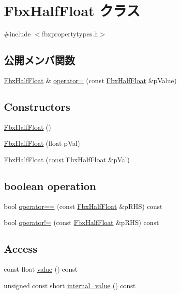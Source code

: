 \hypertarget{class_fbx_half_float}{}\section{Fbx\+Half\+Float クラス}
\label{class_fbx_half_float}


{\ttfamily \#include $<$fbxpropertytypes.\+h$>$}

\subsection*{公開メンバ関数}
\begin{DoxyCompactItemize}
\item 
\hyperlink{class_fbx_half_float}{Fbx\+Half\+Float} \& \hyperlink{class_fbx_half_float_a83e214aced2eacc47a1b0fd768e025a5}{operator=} (const \hyperlink{class_fbx_half_float}{Fbx\+Half\+Float} \&p\+Value)
\end{DoxyCompactItemize}
\subsection*{Constructors}
\begin{DoxyCompactItemize}
\item 
\hyperlink{class_fbx_half_float_adcba4ec850646381daa19115b9e40879}{Fbx\+Half\+Float} ()
\item 
\hyperlink{class_fbx_half_float_acd47a47c67b0d9c57bfbb7055615c303}{Fbx\+Half\+Float} (float p\+Val)
\item 
\hyperlink{class_fbx_half_float_ae8971c684f7e3c98be4906947dc5e01f}{Fbx\+Half\+Float} (const \hyperlink{class_fbx_half_float}{Fbx\+Half\+Float} \&p\+Val)
\end{DoxyCompactItemize}
\subsection*{boolean operation}
\begin{DoxyCompactItemize}
\item 
bool \hyperlink{class_fbx_half_float_a2f0407870ed2ad08a2a97477acfcf193}{operator==} (const \hyperlink{class_fbx_half_float}{Fbx\+Half\+Float} \&p\+R\+HS) const
\item 
bool \hyperlink{class_fbx_half_float_a4ec7516fcc8a5d1c3f446c93a1ffea41}{operator!=} (const \hyperlink{class_fbx_half_float}{Fbx\+Half\+Float} \&p\+R\+HS) const
\end{DoxyCompactItemize}
\subsection*{Access}
\begin{DoxyCompactItemize}
\item 
const float \hyperlink{class_fbx_half_float_a0ee86f74d6747ac89a1081695dd14b37}{value} () const
\item 
unsigned const short \hyperlink{class_fbx_half_float_afca669380f113fca23f5a7e532cf3b57}{internal\+\_\+value} () const
\end{DoxyCompactItemize}


